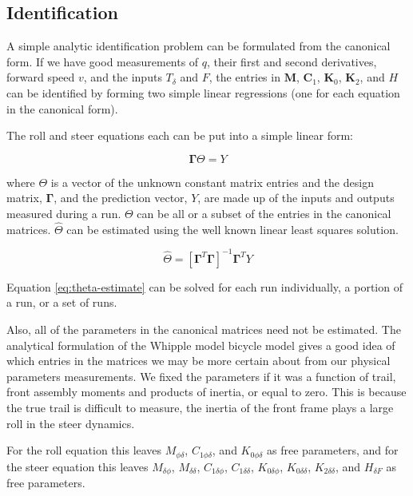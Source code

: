 \documentclass[a4paper]{article}
\begin{document}
\subsection{Identification}

A simple analytic identification problem can be formulated from the canonical
form. If we have good measurements of $q$, their first and second derivatives,
forward speed $v$, and the inputs $T_\delta$ and $F$, the entries in
$\mathbf{M}$, $\mathbf{C}_1$, $\mathbf{K}_0$, $\mathbf{K}_2$, and $H$ can be
identified by forming two simple linear regressions (one for each equation
in the canonical form).

The roll and steer equations each can be put into a simple linear form:

\begin{equation}
  \mathbf{\Gamma} \Theta = Y
\end{equation}

where $\Theta$ is a vector of the unknown constant matrix entries and the
design matrix, $\mathbf{\Gamma}$, and the prediction vector, $Y$, are made up
of the inputs and outputs measured during a run. $\Theta$ can be all or a
subset of the entries in the canonical matrices. $\hat{\Theta}$ can be
estimated using the well known linear least squares solution.

\begin{equation}
  \hat{\Theta} = [\mathbf{\Gamma}^T \mathbf{\Gamma}]^{-1} \mathbf{\Gamma}^T Y
  \label{eq:theta-estimate}
\end{equation}

Equation \ref{eq:theta-estimate} can be solved for each run individually, a
portion of a run, or a set of runs.

Also, all of the parameters in the canonical matrices need not be estimated.
The analytical formulation of the Whipple model bicycle model
\cite{Meijaard2007} gives a good idea of which entries in the matrices we may
be more certain about from our physical parameters measurements. We fixed the
parameters if it was a function of trail, front assembly moments and products
of inertia, or equal to zero. This is because the true trail is difficult to
measure, the inertia of the front frame plays a large roll in the steer
dynamics.

For the roll equation this leaves $M_{\phi\delta}$, $C_{1\phi\delta}$,
and $K_{0\phi\delta}$ as free parameters, and for the steer equation
this leaves $M_{\delta\phi}$, $M_{\delta\delta}$, $C_{1\delta\phi}$,
$C_{1\delta\delta}$, $K_{0\delta\phi}$, $K_{0\delta\delta}$,
$K_{2\delta\delta}$, and $H_{\delta F}$ as free parameters.
\end{document}
